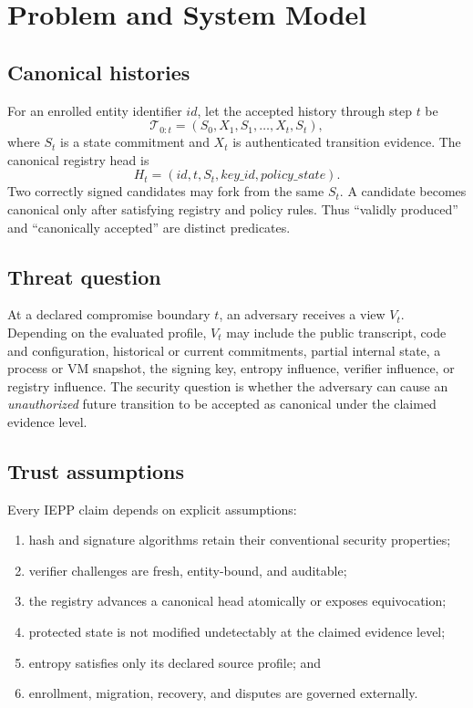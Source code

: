 \documentclass[11pt]{article}
\newcommand{\iepp}{\textsc{IEPP}}
\begin{document}
\section{Problem and System Model}
\subsection{Canonical histories}
For an enrolled entity identifier $id$, let the accepted history through step $t$ be
\begin{equation}
  \mathcal{T}_{0:t}=(S_0,X_1,S_1,\ldots,X_t,S_t),
\end{equation}
where $S_t$ is a state commitment and $X_t$ is authenticated transition evidence. The canonical registry head is
\begin{equation}
  H_t=(id,t,S_t,key\_id,policy\_state).
\end{equation}
Two correctly signed candidates may fork from the same $S_t$. A candidate becomes canonical only after satisfying registry and policy rules. Thus ``validly produced'' and ``canonically accepted'' are distinct predicates.

\subsection{Threat question}
At a declared compromise boundary $t$, an adversary receives a view $V_t$. Depending on the evaluated profile, $V_t$ may include the public transcript, code and configuration, historical or current commitments, partial internal state, a process or VM snapshot, the signing key, entropy influence, verifier influence, or registry influence. The security question is whether the adversary can cause an \emph{unauthorized} future transition to be accepted as canonical under the claimed evidence level.

\subsection{Trust assumptions}
Every \iepp{} claim depends on explicit assumptions:
\begin{enumerate}
  \item hash and signature algorithms retain their conventional security properties;
  \item verifier challenges are fresh, entity-bound, and auditable;
  \item the registry advances a canonical head atomically or exposes equivocation;
  \item protected state is not modified undetectably at the claimed evidence level;
  \item entropy satisfies only its declared source profile; and
  \item enrollment, migration, recovery, and disputes are governed externally.
\end{enumerate}
\end{document}
